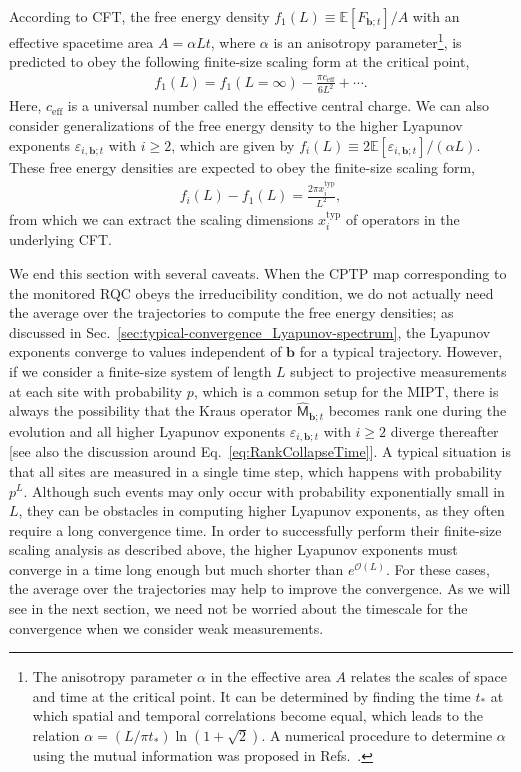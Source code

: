 \documentclass[preprint,pteplogo]{ptephy_v2}%
\numberwithin{equation}{section}
\theoremstyle{definition}
\newcommand{\mc}[1]{\mathcal{#1}}
\begin{document}
According to CFT, the free energy density $f_1(L)\equiv \mathbb{E}[F_{\bm{b};t}]/A$ with an effective spacetime area $A=\alpha L t$, where $\alpha$ is an anisotropy parameter\footnote{
The anisotropy parameter $\alpha$ in the effective area $A$ relates the scales of space and time at the critical point.
It can be determined by finding the time $t_*$ at which spatial and temporal correlations become equal, which leads to the relation $\alpha = (L/\pi t_*)\ln(1+\sqrt{2})$.
A numerical procedure to determine $\alpha$ using the mutual information was proposed in Refs.~\cite{zabalo2022operator, chakraborty24charge}.
}, 
is predicted to obey the following finite-size scaling form at the critical point,
\begin{align}
    f_1(L) = f_1(L=\infty) - \frac{\pi c_{\mathrm{eff}}}{6L^2} + \cdots.
\end{align}
Here, $c_{\mathrm{eff}}$ is a universal number called the effective central charge.
We can also consider generalizations of the free energy density to the higher Lyapunov exponents $\varepsilon_{i,\bm{b};t}$ with $i \geq 2$, which are given by $f_i(L) \equiv 2\mathbb{E}[\varepsilon_{i,\bm{b};t}] / (\alpha L)$.
These free energy densities are expected to obey the finite-size scaling form,
\begin{align}
    f_{i}(L)-f_1(L) = \frac{2\pi x_i^{\mathrm{typ}}}{L^2},
\end{align}
from which we can extract the scaling dimensions $x_i^{\mathrm{typ}}$ of operators in the underlying CFT.

We end this section with several caveats.
When the CPTP map corresponding to the monitored RQC obeys the irreducibility condition, we do not actually need the average over the trajectories to compute the free energy densities; as discussed in Sec.~\ref{sec:typical-convergence_Lyapunov-spectrum}, the Lyapunov exponents converge to values independent of $\bm{b}$ for a typical trajectory.
However, if we consider a finite-size system of length $L$ subject to projective measurements at each site with probability $p$, which is a common setup for the MIPT, there is always the possibility that the Kraus operator $\hat{\mathsf{M}}_{\bm{b};t}$ becomes rank one during the evolution and all higher Lyapunov exponents $\varepsilon_{i,\bm{b};t}$ with $i \geq 2$ diverge thereafter [see also the discussion around Eq.~\eqref{eq:RankCollapseTime}].
A typical situation is that all sites are measured in a single time step, which happens with probability $p^L$.
Although such events may only occur with probability exponentially small in $L$, they can be obstacles in computing higher Lyapunov exponents, as they often require a long convergence time.
In order to successfully perform their finite-size scaling analysis as described above, the higher Lyapunov exponents must converge in a time long enough but much shorter than $e^{\mc{O}(L)}$. 
For these cases, the average over the trajectories may help to improve the convergence.
As we will see in the next section, we need not be worried about the timescale for the convergence when we consider weak measurements.
\end{document}
